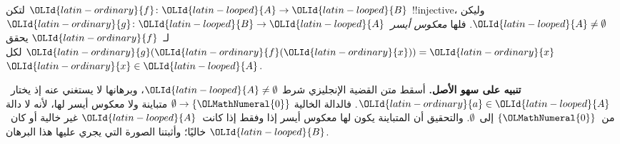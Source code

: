 \documentclass[../../../include/open-logic-section]{subfiles}
\begin{document}
\begin{prop}
لتكن ${\OLId{latin-ordinary}{f}}\colon {\OLId{latin-looped}{A}} \to {\OLId{latin-looped}{B}}$ !!{injective}، وليكن ${\OLId{latin-looped}{A}} \neq \emptyset$.
فلها \emph{معكوس أيسر}~${\OLId{latin-ordinary}{g}}\colon {\OLId{latin-looped}{B}} \to {\OLId{latin-looped}{A}}$ لـ~${\OLId{latin-ordinary}{f}}$ يحقق ${\OLId{latin-ordinary}{g}}({\OLId{latin-ordinary}{f}}({\OLId{latin-ordinary}{x}})) = {\OLId{latin-ordinary}{x}}$
لكل ${\OLId{latin-ordinary}{x}} \in {\OLId{latin-looped}{A}}$.
\end{prop}

\begin{explain}
\textbf{تنبيه على سهو الأصل.} أسقط متن القضية الإنجليزي شرط
${\OLId{latin-looped}{A}}\neq\emptyset$، وبرهانها لا يستغني عنه إذ يختار~${\OLId{latin-ordinary}{a}}\in {\OLId{latin-looped}{A}}$.
فالدالة الخالية $\emptyset\to\{{\OLMathNumeral{0}}\}$ متباينة ولا معكوس أيسر لها،
لأنه لا دالة من~$\{{\OLMathNumeral{0}}\}$ إلى~$\emptyset$. والتحقيق أن المتباينة
يكون لها معكوس أيسر إذا وفقط إذا كانت~${\OLId{latin-looped}{A}}$ غير خالية أو كان~${\OLId{latin-looped}{B}}$
خاليًا؛ وأثبتنا الصورة التي يجري عليها هذا البرهان.
\end{explain}
\end{document}
